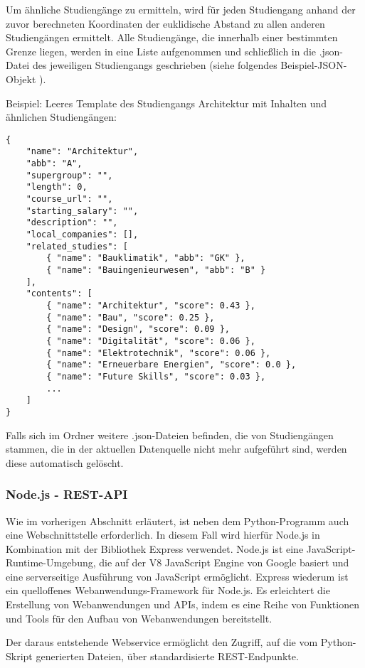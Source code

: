 Um ähnliche Studiengänge zu ermitteln, wird für jeden Studiengang anhand der zuvor berechneten Koordinaten der euklidische Abstand zu allen anderen Studiengängen ermittelt. Alle Studiengänge, die innerhalb einer bestimmten Grenze liegen, werden in eine Liste aufgenommen und schließlich in die .json-Datei des jeweiligen Studiengangs geschrieben (siehe folgendes Beispiel-JSON-Objekt ).

\noindent
Beispiel: Leeres Template des Studiengangs Architektur mit Inhalten und ähnlichen Studiengängen:
\begin{lstlisting}[style=Python]
{
    "name": "Architektur",
    "abb": "A",
    "supergroup": "",
    "length": 0,
    "course_url": "",
    "starting_salary": "",
    "description": "",
    "local_companies": [],
    "related_studies": [
        { "name": "Bauklimatik", "abb": "GK" },
        { "name": "Bauingenieurwesen", "abb": "B" }
    ],
    "contents": [
        { "name": "Architektur", "score": 0.43 },
        { "name": "Bau", "score": 0.25 },
        { "name": "Design", "score": 0.09 },
        { "name": "Digitalität", "score": 0.06 },
        { "name": "Elektrotechnik", "score": 0.06 },
        { "name": "Erneuerbare Energien", "score": 0.0 },
        { "name": "Future Skills", "score": 0.03 },
        ...
    ]
}
\end{lstlisting}

Falls sich im Ordner weitere .json-Dateien befinden, die von Studiengängen stammen, die in der aktuellen Datenquelle nicht mehr aufgeführt sind, werden diese automatisch gelöscht.

\newpage
\subsubsection{Node.js - REST-API}\label{sec:node-js-restapi}
Wie im vorherigen Abschnitt erläutert, ist neben dem Python-Programm auch eine Webschnittstelle erforderlich. In diesem Fall wird hierfür Node.js in Kombination mit der Bibliothek Express verwendet. Node.js ist eine JavaScript-Runtime-Umgebung, die auf der V8 JavaScript Engine von Google basiert und eine serverseitige Ausführung von JavaScript ermöglicht. \parencite{foundation_nodejs_2023} Express wiederum ist ein quelloffenes Webanwendungs-Framework für Node.js. Es erleichtert die Erstellung von Webanwendungen und APIs, indem es eine Reihe von Funktionen und Tools für den Aufbau von Webanwendungen bereitstellt.
\parencite{foundation_express_2023}

Der daraus entstehende Webservice ermöglicht den Zugriff, auf die vom Python-Skript generierten Dateien, über standardisierte REST-Endpunkte.

